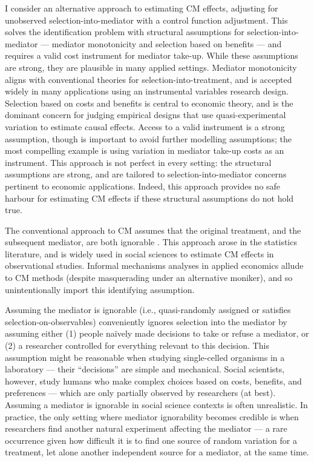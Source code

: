 I consider an alternative approach to estimating CM effects, adjusting for unobserved selection-into-mediator with a control function adjustment.
This solves the identification problem with structural assumptions for selection-into-mediator --- mediator monotonicity and selection based on benefits --- and requires a valid cost instrument for mediator take-up.
While these assumptions are strong, they are plausible in many applied settings.
Mediator monotonicity aligns with conventional theories for selection-into-treatment, and is accepted widely in many applications using an instrumental variables research design.
Selection based on costs and benefits is central to economic theory, and is the dominant concern for judging empirical designs that use quasi-experimental variation to estimate causal effects.
Access to a valid instrument is a strong assumption, though is important to avoid further modelling assumptions; the most compelling example is using variation in mediator take-up costs as an instrument.
This approach is not perfect in every setting: the structural assumptions are strong, and are tailored to selection-into-mediator concerns pertinent to economic applications.
Indeed, this approach provides no safe harbour for estimating CM effects if these structural assumptions do not hold true.

The conventional approach to CM assumes that the original treatment, and the subsequent mediator, are both ignorable \citep{imai2010identification}.
This approach arose in the statistics literature, and is widely used in social sciences to estimate CM effects in observational studies.
Informal mechanisms analyses in applied economics allude to CM methods (despite masquerading under an alternative moniker), and so unintentionally import this identifying assumption.

Assuming the mediator is ignorable (i.e., quasi-randomly assigned or satisfies selection-on-observables) conveniently ignores selection into the mediator by assuming either (1) people na\"ively made decisions to take or refuse a mediator, or (2) a researcher controlled for everything relevant to this decision.
This assumption might be reasonable when studying single-celled organisms in a laboratory --- their ``decisions'' are simple and mechanical.
Social scientists, however, study humans who make complex choices based on costs, benefits, and preferences --- which are only partially observed by researchers (at best).
Assuming a mediator is ignorable in social science contexts is often unrealistic.
In practice, the only setting where mediator ignorability becomes credible is when researchers find another natural experiment affecting the mediator --- a rare occurrence given how difficult it is to find one source of random variation for a treatment, let alone another independent source for a mediator, at the same time.

